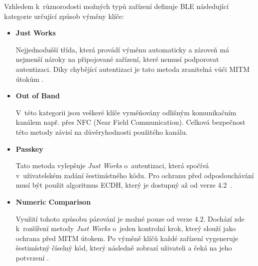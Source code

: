    Vzhledem k~různorodosti možných typů zařízení definuje BLE následující kategorie
   určující způsob výměny klíče:
    \begin{itemize}
     \item \textbf{Just Works}
     
     Nejjednodušší třída, která provádí výměnu automaticky a zároveň má nejmenší nároky 
     na připojované zařízení, které nemusí podporovat autentizaci. Díky chybějící autentizaci 
     je tato metoda zranitelná vůči MITM útokům \cite{cesnet-survey}.
     \item \textbf{Out of Band}
     
     V~této kategorii jsou veškeré klíče vyměňovány odlišným komunikačním kanálem např. přes NFC (Near Field Communication).
     Celková bezpečnost této metody závisí na důvěryhodnosti použitého kanálu.
     \item \textbf{Passkey}
     
     Tato metoda vylepšuje \textit{Just Works} o~autentizaci, která spočívá v~uživatelském zadání 
     šestimístného kódu. Pro ochranu před odposlouchávání musí být použit algoritmus ECDH,
     který je dostupný až od verze 4.2~\cite{cesnet-survey}.
     
     \item \textbf{Numeric Comparison}
     
     Využití tohoto způsobu párování je možné pouze od verze 4.2. Dochází zde k~rozšíření metody \textit{Just Works}
     o~jeden kontrolní krok, který slouží jako ochrana před MITM útokem. Po výměně klíčů každé zařízení
     vygeneruje šestimístný číselný kód, který následně zobrazí uživateli a čeká na jeho potvrzení \cite{cesnet-survey}.   
     
    \end{itemize}

    